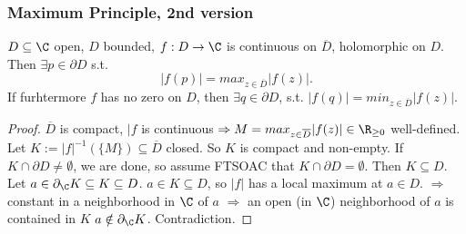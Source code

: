 \begin{proposition}
  \subsubsection*{Maximum Principle, 2nd version}
  $D\subseteq \C$ open, $D$ bounded, $f:D\to \C$ is continuous on $\overline{D}$, holomorphic on $D$. Then $\exists p \in \partial D$ s.t.
    $$|f(p)|=max_{z\in \overline{D}}|f(z)|.$$
  If furhtermore $f$ has no zero on $D$, then $\exists q\in \partial D$, s.t. $|f(q)|=min_{z\in \overline{D}}|f(z)|$.
\end{proposition}
\begin{proof}
  $\overline{D}$ is compact, $|f$ is continuous $\Rightarrow M=max_{z\in \overline{D}}|f(z)|\in \R_{\geq 0}$ well-defined. Let $K:=|f|^{-1}(\{M\})\subseteq \overline{D}$ closed. So $K$ is compact and non-empty. If $K\cap \partial D \neq \emptyset $, we are done, so assume FTSOAC that $K\cap \partial D = \emptyset$. Then $K\subseteq D$.
  Let $a\in \partial_{\C}K\subseteq K\subseteq D$.
  \newline $a\in K\subseteq D$, so $|f|$ has a local maximum at $a\in D$.
  \newline $\Rightarrow$ constant in a neighborhood in $\C$ of $a$ $\Rightarrow $ an open (in $\C$) neighborhood of $a$ is contained in $K$
  \newline $a\notin \partial_{\C}K$. Contradiction.
\end{proof}
